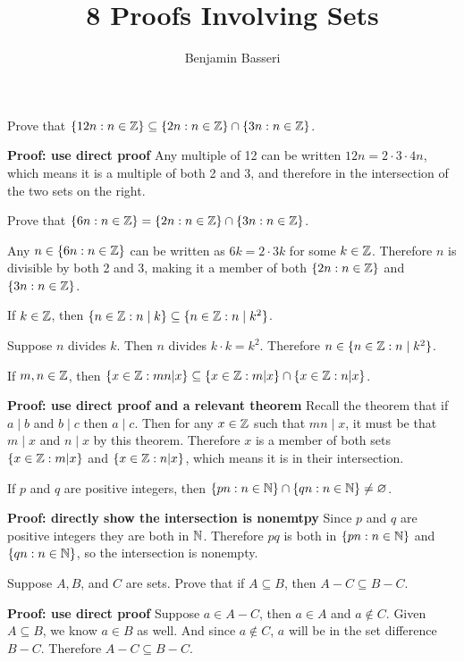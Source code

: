 \documentclass{article}
\title{8 Proofs Involving Sets}
\author{Benjamin Basseri}
\begin{document}
\maketitle


\begin{problem}
Prove that \(\{12n : n \in \mathbb{Z}\} \subseteq \{2n : n \in \mathbb{Z}\} \cap \{3n : n \in \mathbb{Z}\}\).
\end{problem}

\textbf{Proof: use direct proof}
Any multiple of 12 can be written \(12n = 2\cdot3\cdot4 n\), which means it is a multiple of both 2 and 3, and therefore in the intersection of the two sets on the right.

\begin{problem}
Prove that \(\{6n: n \in \mathbb{Z}\} = \{2n : n \in \mathbb{Z}\} \cap \{3n : n \in \mathbb{Z}\}\).
\end{problem}
Any \(n \in \{6n: n \in \mathbb{Z}\}\) can be written as \(6k = 2\cdot 3k\) for some \(k \in \mathbb{Z}\). Therefore \(n\) is divisible by both 2 and 3, making it a member of both \(\{2n : n \in \mathbb{Z}\}\) and \(\{3n : n \in \mathbb{Z}\}\).

\begin{problem}
If \(k \in \mathbb{Z}\), then $\{n \in \mathbb{Z}: n \mid k\} \subseteq \{n \in \mathbb{Z}: n \mid k^2\}$.
\end{problem}
Suppose $n$ divides $k$. Then $n$ divides $k\cdot k = k^2$. Therefore $n \in \{n\in \mathbb{Z}: n \mid k^2\}$.

\begin{problem}
If $m, n \in \mathbb{Z}$, then $\{x \in \mathbb{Z}: mn | x\} \subseteq \{x \in \mathbb{Z}: m | x\} \cap \{x \in \mathbb{Z}: n | x\}$.
\end{problem}
\textbf{Proof: use direct proof and a relevant theorem}
Recall the theorem that if $a \mid b$ and $b \mid c$ then $a \mid c$. Then for any $x \in \mathbb{Z}$ such that $mn \mid x$, it must be that $m \mid x$ and $n \mid x$ by this theorem. Therefore $x$ is a member of both sets $\{x \in \mathbb{Z}: m | x\}$ and $\{x \in \mathbb{Z}: n | x\}$, which means it is in their intersection.

\begin{problem}
If $p$ and $q$ are positive integers, then $\{pn : n \in \mathbb{N}\} \cap \{qn : n \in \mathbb{N}\} \neq \varnothing$.
\end{problem}
\textbf{Proof: directly show the intersection is nonemtpy}
Since $p$ and $q$ are positive integers they are both in $\mathbb{N}$. Therefore $pq$ is both in $\{pn : n \in \mathbb{N}\}$ and $\{qn : n \in \mathbb{N}\}$, so the intersection is nonempty.

\begin{problem}
Suppose $A, B$, and $C$ are sets. Prove that if $A \subseteq B$, then $A - C \subseteq B - C$.
\end{problem}
\textbf{Proof: use direct proof}
Suppose $a \in A - C$, then $a \in A$ and $a \not\in C$. Given $A \subseteq B$, we know $a \in B$ as well. And since $a \not\in C$, $a$ will be in the set difference $B - C$. Therefore $A - C \subseteq B - C$.
\end{document}
